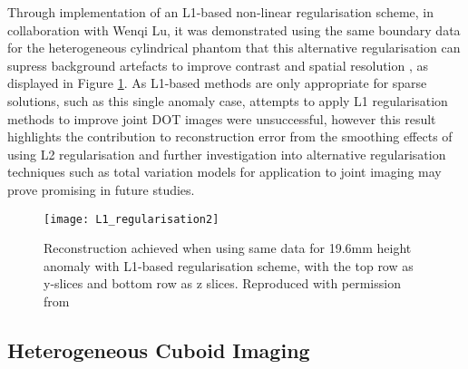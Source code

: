 \documentclass[twoside]{bhamthesis}
\theoremstyle{definition}
\begin{document}
Through implementation of an L1-based non-linear regularisation scheme, in collaboration with Wenqi Lu, it was demonstrated using the same boundary data for the heterogeneous cylindrical phantom that this alternative regularisation can supress background artefacts to improve contrast and spatial resolution \cite{lu20181}, as displayed in Figure \ref{fig:L1_regularisation}. As L1-based methods are only appropriate for sparse solutions, such as this single anomaly case, attempts to apply L1 regularisation methods to improve joint DOT images were unsuccessful, however this result highlights the contribution to reconstruction error from the smoothing effects of using L2 regularisation and further investigation into alternative regularisation techniques such as total variation models \cite{lu2019graph} for application to joint imaging may prove promising in future studies.

\begin{figure}[!ht]
\centering
  \texttt{[image: L1\_regularisation2]}
  \caption{Reconstruction achieved when using same data for 19.6mm height anomaly with L1-based regularisation scheme, with the top row as y-slices and bottom row as z slices. Reproduced with permission from \cite{lu20181}}
    \label{fig:L1_regularisation}
\end{figure}


\subsection{Heterogeneous Cuboid Imaging}
\label{Heterogenous Cuboid Imaging}
\end{document}
